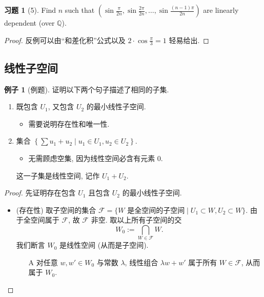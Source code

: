 \documentclass[11pt]{ctexart}
\theoremstyle{definition}
\numberwithin{equation}{section}
\theoremstyle{definition}
\newtheorem*{example}{例子}
\newtheorem*{exercise}{习题}
\theoremstyle{remark}
\begin{document}
\begin{exercise}[5]
    Find $n$ such that $\left(\sin \frac{\pi}{2n},\sin \frac{2\pi}{2n},\ldots, \sin \frac{(n-1)\pi}{2n}\right)$ are linearly dependent (over $\mathbb Q$). 
    \begin{proof}
        反例可以由``和差化积''公式以及 $2\cdot \cos\frac{\pi}{3}=1$ 轻易给出. 
    \end{proof}
\end{exercise}

\subsection{线性子空间}

\begin{example}[例题]
    证明以下两个句子描述了相同的子集. 
    \begin{enumerate}
        \item 既包含 $U_1$, 又包含 $U_2$ 的最小线性子空间.
        \begin{itemize}
            \item 需要说明存在性和唯一性.
        \end{itemize}
        \item  集合 $\left\{\sum u_1+u_2\mid u_1\in U_1, u_2\in U_2\right\}$.
        \begin{itemize}
            \item 无需顾虑空集, 因为线性空间必含有元素 $0$.
        \end{itemize}
        这一子集是线性空间, 记作 $U_1+U_2$. 
    \end{enumerate}
    \begin{proof}
        先证明存在包含 $U_1$ 且包含 $U_2$ 的最小线性子空间. 
        \begin{itemize}
            \item (存在性) 取子空间的集合 $\mathscr F=\{W\text{ 是全空间的子空间}\mid U_1\subset W, U_2\subset W\}$. 由于全空间属于 $\mathscr F$, 故 $\mathscr F$ 非空. 取以上所有子空间的交
            \begin{equation}
                W_0:=\bigcap _{W\in \mathscr F}W. 
            \end{equation}
            我们断言 $W_0$ 是线性空间 (从而是子空间). 
            \begin{itemize}
                \item[A] 对任意 $w,w'\in W_0$ 与常数 $\lambda$, 线性组合 $\lambda w+w'$ 属于所有 $W\in \mathscr F$, 从而属于 $W_0$. 
            \end{itemize}

\end{itemize}
\end{proof}
\end{example}
\end{document}
